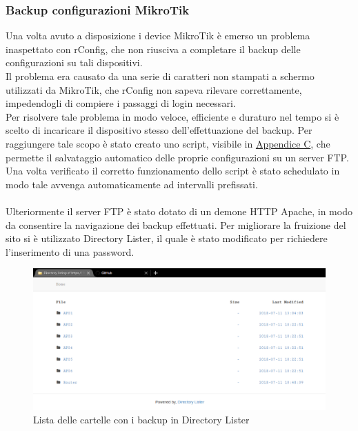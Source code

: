 \documentclass[Realizzazione.tex]{subfiles}
\begin{document}
\subsubsection{Backup configurazioni MikroTik}
Una volta avuto a disposizione i device MikroTik è emerso un problema inaspettato con rConfig, che non riusciva a completare il backup delle configurazioni su tali dispositivi. \\
Il problema era causato da una serie di caratteri non stampati a schermo utilizzati da MikroTik, che rConfig non sapeva rilevare correttamente, impedendogli di compiere i passaggi di login necessari. \\
Per risolvere tale problema in modo veloce, efficiente e duraturo nel tempo si è scelto di incaricare il dispositivo stesso dell'effettuazione del backup. Per raggiungere tale scopo è stato creato uno script, visibile in \hyperref[sec:Appendice C]{Appendice C}, che permette il salvataggio automatico delle proprie configurazioni su un server FTP. \\
Una volta verificato il corretto funzionamento dello script è stato schedulato in modo tale avvenga automaticamente ad intervalli prefissati. \\\\
Ulteriormente il server FTP è stato dotato di un demone HTTP Apache, in modo da consentire la navigazione dei backup effettuati. Per migliorare la fruizione del sito si è utilizzato Directory Lister, il quale è stato modificato per richiedere l'inserimento di una password. \\

\begin{figure}[H]
	\centering
	\includegraphics[width=1\linewidth]{"images/DirectoryLister"}
	\caption{Lista delle cartelle con i backup in Directory Lister}
	\label{fig:Lista delle cartelle con i backup in Directory Lister}
\end{figure}
\end{document}
